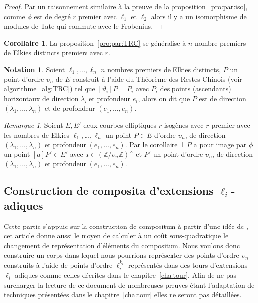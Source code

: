 \documentclass[10pt,a4paper]{book}
\theoremstyle{plain}
\theoremstyle{definition}
\theoremstyle{definition}
\theoremstyle{definition}
\newtheorem{cor}[thm]{Corollaire}
\theoremstyle{definition}
\theoremstyle{definition}
\theoremstyle{remark}
\newtheorem{rem}[thm]{Remarque}
\theoremstyle{remark}
\theoremstyle{definition}
\newtheorem{nota}[thm]{Notation}
\begin{document}
\begin{proof}
Par un raisonnement similaire à la preuve de la proposition~\ref{pro:par:iso}, 
comme $\phi$ est de degré $r$ premier avec $\ell_1$ et $\ell_2$ alors il y a un
isomorphisme de modules de Tate qui commute avec le Frobenius.
\end{proof}

\begin{cor} 
\label{cor:par:TRC}
La proposition~\ref{pro:par:TRC} se généralise à $n$ nombre premiers de Elkies 
distincts premiers avec $r$.
\end{cor}

\begin{nota}
Soient $\ell_1, \dots, \ell_n$ $n$ nombres premiers de Elkies distincts, $P$ un
point d'ordre $\upsilon_n$ de $E$ construit à l'aide du 
Théorème des Restes Chinois (voir algorithme~\ref{alg:TRC}) tel que 
$[\vartheta_i]P=P_i$ avec $P_i$ des points (ascendants) horizontaux de 
direction $\lambda_i$ et profondeur $e_i$, alors 
on dit que $P$ est de direction $(\lambda_1, \dots, \lambda_n)$ et de 
profondeur $(e_1, \dots, e_n)$. 
\end{nota}

\begin{rem}
Soient  $E,E'$ deux courbes elliptiques $r$-isogènes avec $r$ 
premier avec les nombres de Elkies $\ell_1, \dots, \ell_n$ un point $P \in E$ 
d'ordre $\upsilon_n$, de direction $(\lambda_1, \dots, \lambda_n)$ et 
profondeur $(e_1, \dots, e_n)$. Par le corollaire~\ref{cor:par:TRC} $P$ a pour 
image par $\phi$ un point $[a]P' \in E'$ avec $a \in (\mathbb{Z}/\upsilon_n 
\mathbb{Z})^{\times}$ et $P'$ un point d'ordre $\upsilon_n$, de direction 
$(\lambda_1, \dots, \lambda_n)$ et profondeur $(e_1, \dots, e_n)$.
%
\end{rem}


\subsection{Construction de composita d'extensions $\ell_i$-adiques}
\label{sub:con:com}

Cette partie s'appuie sur la construction de compositum à partir d'une idée de
\cite{DeFeoDoliskaniSchost14}, cet article donne aussi le moyen de calculer à 
un coût sous-quadratique le changement de représentation d'éléments du 
compositum. Nous voulons donc construire un corps dans lequel nous pourrions 
représenter des points d'ordre $\upsilon_n$ construits à l'aide de points 
d'ordre $\ell_i^{k_i}$ représentés dans des tours d'extensions $\ell_i$-adiques
comme celles décrites dans le chapitre~\ref{cha:tour}. Afin de ne pas 
surcharger la lecture de ce document de nombreuses preuves étant l'adaptation 
de techniques présentées dans le chapitre~\ref{cha:tour} elles ne seront pas 
détaillées.
\end{document}
